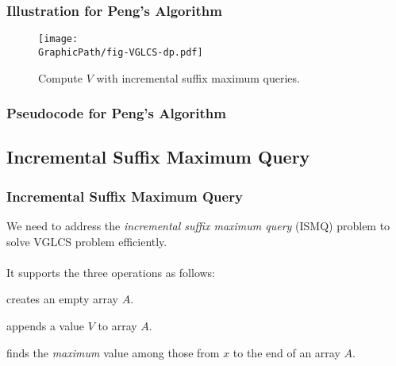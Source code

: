 \begin{frame}
    \frametitle{Illustration for Peng's Algorithm}
    \begin{figure}[!thb]
		\texttt{[image: \\GraphicPath/fig-VGLCS-dp.pdf]}
		\caption{Compute $V$ with incremental suffix maximum queries.}
		\label{fig:basic-dp-VGLCS}
	\end{figure}
\end{frame}

\begin{withoutheadline}
\begin{frame}
	\frametitle{Pseudocode for Peng's Algorithm}
	\begin{center}
		\scalebox{.7} { \begin{minipage}{1.2\textwidth}
			
			\end{minipage}
		}
	\end{center}
\end{frame}
\end{withoutheadline}

\subsection{Incremental Suffix Maximum Query}
\begin{frame}
    \frametitle{Incremental Suffix Maximum Query}

    We need to address the {\em incremental suffix maximum query} (ISMQ)
    problem to solve VGLCS problem efficiently.
    \\~\\
    It supports the three operations as follows:
    \begin{description}[align=right]
    	\setlength\itemsep{1em}
    	\item[{\sc Make}]
			creates an empty array $A$.
		\item[{\sc Append(V)}]
			appends a value $V$ to array $A$. 
		\item[{\sc Query(x)}]
			finds the {\em maximum} value among those from $x$ to the
			end of an array $A$.
    \end{description}
\end{frame}

